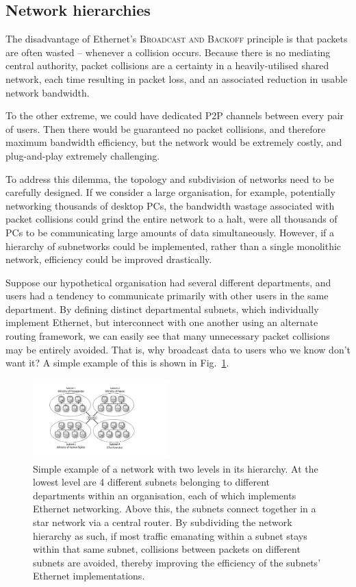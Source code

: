 %
%

\subsection{Network hierarchies} 

The disadvantage of Ethernet's \textsc{Broadcast and Backoff} principle is that packets are often wasted -- whenever a collision occurs. Because there is no mediating central authority, packet collisions are a certainty in a heavily-utilised shared network, each time resulting in packet loss, and an associated reduction in usable network bandwidth.

To the other extreme, we could have dedicated P2P channels between every pair of users. Then there would be guaranteed no packet collisions, and therefore maximum bandwidth efficiency, but the network would be extremely costly, and plug-and-play extremely challenging.

To address this dilemma, the topology and subdivision of networks need to be carefully designed. If we consider a large organisation, for example, potentially networking thousands of desktop PCs, the bandwidth wastage associated with packet collisions could grind the entire network to a halt, were all thousands of PCs to be communicating large amounts of data simultaneously. However, if a hierarchy of subnetworks could be implemented, rather than a single monolithic network, efficiency could be improved drastically.

Suppose our hypothetical organisation had several different departments, and users had a tendency to communicate primarily with other users in the same department. By defining distinct departmental subnets, which individually implement Ethernet, but interconnect with one another using an alternate routing framework, we can easily see that many unnecessary packet collisions may be entirely avoided. That is, why broadcast data to users who we know don't want it? A simple example of this is shown in Fig.~\ref{fig:net_hierarchy}.

\begin{figure}[!htb]
	\includegraphics[width=0.47\textwidth]{network_hierarchy}
	\caption{Simple example of a network with two levels in its hierarchy. At the lowest level are 4 different subnets belonging to different departments within an organisation, each of which implements Ethernet networking. Above this, the subnets connect together in a star network via a central router. By subdividing the network hierarchy as such, if most traffic emanating within a subnet stays within that same subnet, collisions between packets on different subnets are avoided, thereby improving the efficiency of the subnets' Ethernet implementations.} \label{fig:net_hierarchy}
\end{figure}


